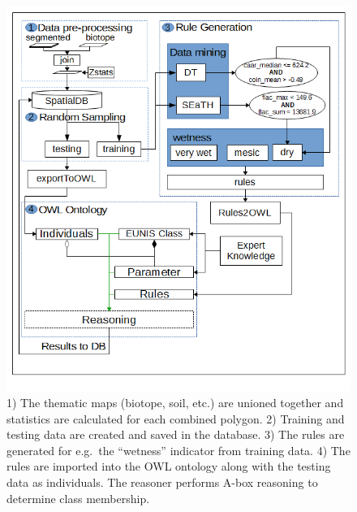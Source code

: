 \documentclass[authoryear, review,12pt,number]{elsarticle}
\begin{document}
\begin{figure}
\includegraphics[width=1\linewidth]{diagrams/another_workflow_diagram_large.png}
\caption
    {
        1) The thematic maps (biotope, soil, etc.) are unioned together and
        statistics are calculated for each combined polygon.
        2) Training and testing data are created and saved in the database.
        3) The rules are generated for e.g.\ the ``wetness'' indicator from
        training data.
        4) The rules are imported into the OWL ontology along with the testing
        data as individuals. The reasoner performs A-box reasoning to determine
        class membership.
    } 
\label{fig_full_workflow}
\end{figure}


\label{subsec:Preparation_of_reference_data_and_semantic_characterisation}
\end{document}
